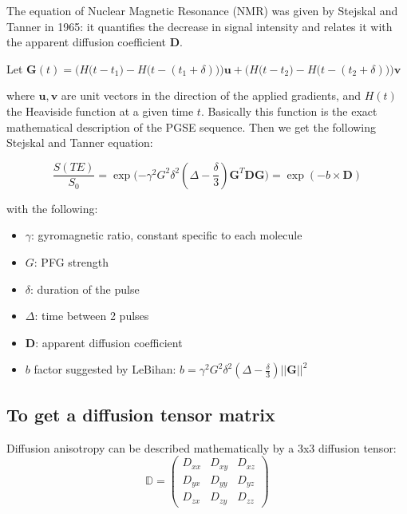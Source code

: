 The equation of Nuclear Magnetic Resonance (NMR) was given by Stejskal and Tanner in 1965: it quantifies the decrease in signal intensity and relates it with the apparent diffusion coefficient $\mathbf{D}$.

Let $\mathbf{G}(t) = \Big(H\big(t - t_1\big) - H\big(t - (t_1 + \delta)\big)\Big)\mathbf{u} + \Big(H\big(t - t_2\big) - H\big(t - (t_2 + \delta)\big)\Big) \mathbf{v}$

where $\mathbf{u}, \mathbf{v}$ are unit vectors in the direction of the applied gradients, and $H(t)$ the Heaviside function at a given time $t$. Basically this function is the exact mathematical description of the PGSE sequence. Then we get the following Stejskal and Tanner equation:

\begin{equation} \label{eq:tanner}
\frac{S(TE)}{S_0} = \exp\Big({-\gamma^2G^2\delta^2(\Delta - \frac{\delta}{3})\mathbf{G}^T\mathbf{D}\mathbf{G}\Big)} = \exp (-b \times \mathbf{D})
\end{equation}

with the following:

\begin{itemize}
    \item $\gamma$: gyromagnetic ratio, constant specific to each molecule
    \item $G$: PFG strength
    \item $\delta$: duration of the pulse
    \item $\Delta$: time between 2 pulses
    \item $\mathbf{D}$: apparent diffusion coefficient
    \item $b$ factor suggested by LeBihan: $b = \gamma^2G^2\delta^2(\Delta - \frac{\delta}{3})||\mathbf{G}||^2$
\end{itemize}

\subsection{To get a diffusion tensor matrix} \label{diffusion_tensor_matrix}

Diffusion anisotropy can be described mathematically by a 3x3 diffusion tensor:
\begin{equation}
    \mathbb{D} = \begin{pmatrix}
    D_{xx} & D_{xy} & D_{xz} \\
    D_{yx} & D_{yy} & D_{yz} \\
    D_{zx} & D_{zy} & D_{zz}
    \end{pmatrix}
\end{equation}

